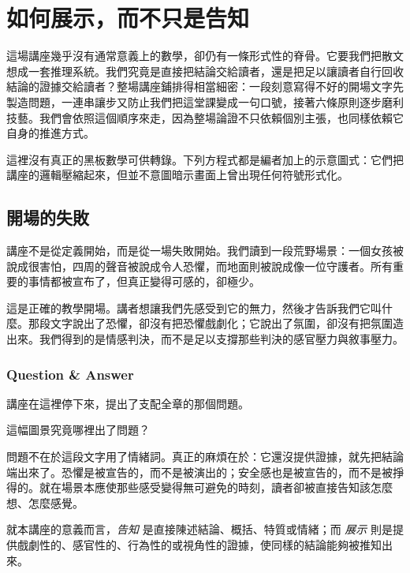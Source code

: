 \chapter{如何展示，而不只是告知}

這場講座幾乎沒有通常意義上的數學，卻仍有一條形式性的脊骨。它要我們把散文想成一套推理系統。我們究竟是直接把結論交給讀者，還是把足以讓讀者自行回收結論的證據交給讀者？整場講座鋪排得相當細密：一段刻意寫得不好的開場文字先製造問題，一連串讓步又防止我們把這堂課變成一句口號，接著六條原則逐步磨利技藝。我們會依照這個順序來走，因為整場論證不只依賴個別主張，也同樣依賴它自身的推進方式。

\begin{remark}
這裡沒有真正的黑板數學可供轉錄。下列方程式都是編者加上的示意圖式：它們把講座的邏輯壓縮起來，但並不意圖暗示畫面上曾出現任何符號形式化。
\end{remark}

\section{開場的失敗}

講座不是從定義開始，而是從一場失敗開始。我們讀到一段荒野場景：一個女孩被說成很害怕，四周的聲音被說成令人恐懼，而地面則被說成像一位守護者。所有重要的事情都被宣布了，但真正變得可感的，卻極少。

這是正確的教學開場。講者想讓我們先感受到它的無力，然後才告訴我們它叫什麼。那段文字說出了恐懼，卻沒有把恐懼戲劇化；它說出了氛圍，卻沒有把氛圍造出來。我們得到的是情感判決，而不是足以支撐那些判決的感官壓力與敘事壓力。

\subsection{Question \& Answer}

講座在這裡停下來，提出了支配全章的那個問題。

這幅圖景究竟哪裡出了問題？

問題不在於這段文字用了情緒詞。真正的麻煩在於：它還沒提供證據，就先把結論端出來了。恐懼是被宣告的，而不是被演出的；安全感也是被宣告的，而不是被掙得的。就在場景本應使那些感受變得無可避免的時刻，讀者卻被直接告知該怎麼想、怎麼感覺。

\begin{definition}
就本講座的意義而言，\emph{告知} 是直接陳述結論、概括、特質或情緒；而 \emph{展示} 則是提供戲劇性的、感官性的、行為性的或視角性的證據，使同樣的結論能夠被推知出來。
\end{definition}

